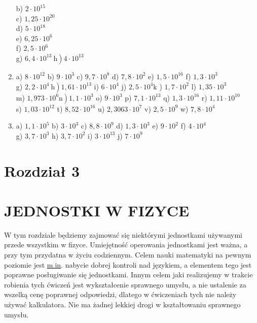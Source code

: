\documentclass[10pt]{article}
\begin{document}
\begin{enumerate}
b) \(2 \cdot 10^{15}\)\\
c) \(1,25 \cdot 10^{20}\)\\
d) \(5 \cdot 10^{18}\)\\
e) \(6,25 \cdot 10^{6}\)\\
f) \(2,5 \cdot 10^{6}\)\\
g) \(\left.6,4 \cdot 10^{13} \mathrm{~h}\right) 4 \cdot 10^{13}\)
  \item a) \(8 \cdot 10^{12}\) b) \(9 \cdot 10^{3}\) c) \(9,7 \cdot 10^{8}\) d) \(7,8 \cdot 10^{2}\) e) \(1,5 \cdot 10^{16}\) f) \(1,3 \cdot 10^{3}\)\\
g) \(\left.2,2 \cdot 10^{4} \mathrm{~h}\right) 1,61 \cdot 10^{13}\) i) \(6 \cdot 10^{4}\) j) \(2,5 \cdot 10^{4} \mathrm{k}\) ) \(1,7 \cdot 10^{2}\) l) \(1,35 \cdot 10^{3}\)\\
m) \(\left.1,973 \cdot 10^{6} \mathrm{n}\right) 1,1 \cdot 10^{3}\) o) \(9 \cdot 10^{3}\) p) \(7,1 \cdot 10^{13}\) q) \(1,3 \cdot 10^{16}\) r) \(1,11 \cdot 10^{10}\)\\
s) \(1,03 \cdot 10^{12}\) t) \(8,52 \cdot 10^{16}\) u) \(2,3063 \cdot 10^{7}\) v) \(2,5 \cdot 10^{9}\) w) \(7,8 \cdot 10^{4}\)
  \item a) \(1,1 \cdot 10^{5}\) b) \(3 \cdot 10^{3}\) c) \(8,8 \cdot 10^{9}\) d) \(1,3 \cdot 10^{3}\) e) \(9 \cdot 10^{2}\) f) \(4 \cdot 10^{4}\)\\
g) \(3,7 \cdot 10^{3}\) h) \(3,7 \cdot 10^{2}\) i) \(3 \cdot 10^{13}\) j) \(7 \cdot 10^{9}\)
\end{enumerate}

\section*{Rozdział 3}
\section*{JEDNOSTKI W FIZYCE}
W tym rozdziale będziemy zajmować się niektórymi jednostkami używanymi przede wszystkim w fizyce. Umiejętność operowania jednostkami jest ważna, a przy tym przydatna w życiu codziennym. Celem nauki matematyki na pewnym poziomie jest \href{http://m.in}{m.in}. nabycie dobrej kontroli nad językiem, a elementem tego jest poprawne posługiwanie się jednostkami. Innym celem jaki realizujemy w trakcie robienia tych ćwiczeń jest wykształcenie sprawnego umysłu, a nie ustalenie za wszelką cenę poprawnej odpowiedzi, dlatego w ćwiczeniach tych nie należy używać kalkulatora. Nie ma żadnej lekkiej drogi w kształtowaniu sprawnego umysłu.
\end{document}
